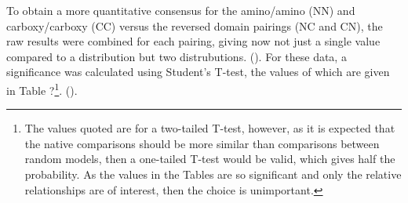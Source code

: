 To obtain a more quantitative consensus
for the amino/amino (NN) and carboxy/carboxy (CC) versus the reversed domain pairings
(NC and CN), the raw results were combined for each pairing, giving now not just a
single value compared to a distribution but two distrubutions. ().   For these data,
a significance was calculated using Student's T-test, the values of which are given
in Table ?\footnote{
The values quoted are for a two-tailed T-test, however, as it is expected that the native
comparisons should be more similar than comparisons between random models, then a
one-tailed T-test would be valid, which gives half the probability.   As the values
in the Tables are so significant and only the relative relationships are of interest,
then the choice is unimportant.
}. ().

%
%
%

